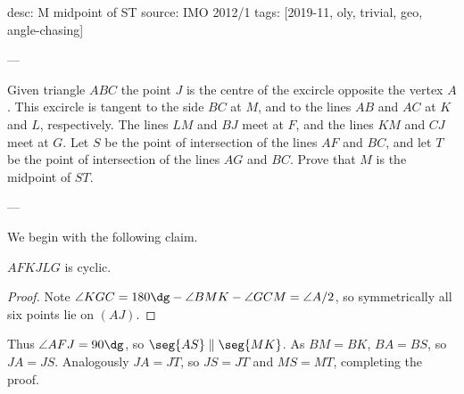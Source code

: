 desc: M midpoint of ST
source: IMO 2012/1
tags: [2019-11, oly, trivial, geo, angle-chasing]

---

Given triangle $ABC$ the point $J$ is the centre of the excircle opposite the vertex $A$. This excircle is tangent to the side $BC$ at $M$, and to the lines $AB$ and $AC$ at $K$ and $L$, respectively. The lines $LM$ and $BJ$ meet at $F$, and the lines $KM$ and $CJ$ meet at $G$. Let $S$ be the point of intersection of the lines $AF$ and $BC$, and let $T$ be the point of intersection of the lines $AG$ and $BC$. Prove that $M$ is the midpoint of $ST$.

---

We begin with the following claim.
\begin{claim*}
    $AFKJLG$ is cyclic.
\end{claim*}
\begin{proof}
    Note $\angle KGC=180\dg-\angle BMK-\angle GCM=\angle A/2$, so symmetrically all six points lie on $(AJ)$.
\end{proof}

Thus $\angle AFJ=90\dg$, so $\seg{AS}\parallel\seg{MK}$. As $BM=BK$, $BA=BS$, so $JA=JS$. Analogously $JA=JT$, so $JS=JT$ and $MS=MT$, completing the proof.
